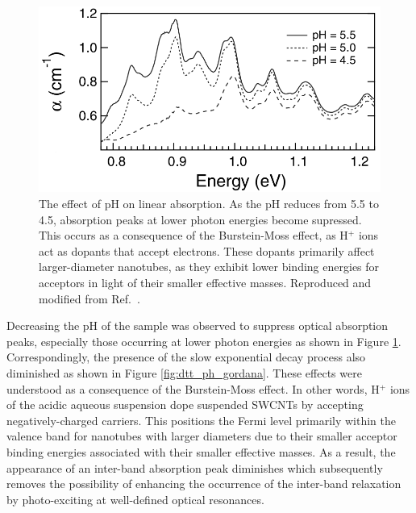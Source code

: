 \begin{figure}[ht]
	\centering
	\includegraphics[scale=1.5]{images/chapter_prior_works/ph_effect_gordana_revised}
	\caption{The effect of pH on linear absorption. As the pH reduces from 5.5 to 4.5, absorption peaks at lower photon energies become supressed. This occurs as a consequence of the Burstein-Moss effect, as H$^+$ ions act as dopants that accept electrons. These dopants primarily affect larger-diameter nanotubes, as they exhibit lower binding energies for acceptors in light of their smaller effective masses. Reproduced and modified from Ref.\ \cite{ostojic2004interband}.}
	\label{fig:ph_abs_gordana}
\end{figure}

Decreasing the pH of the sample was observed to suppress optical absorption peaks, especially those occurring at lower photon energies as shown in Figure \ref{fig:ph_abs_gordana}. Correspondingly, the presence of the slow exponential decay process also diminished as shown in Figure \ref{fig:dtt_ph_gordana}. These effects were understood as a consequence of the Burstein-Moss effect. In other words, H$^+$ ions of the acidic aqueous suspension dope suspended SWCNTs by accepting negatively-charged carriers. This positions the Fermi level primarily within the valence band for nanotubes with larger diameters due to their smaller acceptor binding energies associated with their smaller effective masses.  As a result, the appearance of an inter-band absorption peak diminishes which subsequently removes the possibility of enhancing the occurrence of the inter-band relaxation by photo-exciting at well-defined optical resonances.

